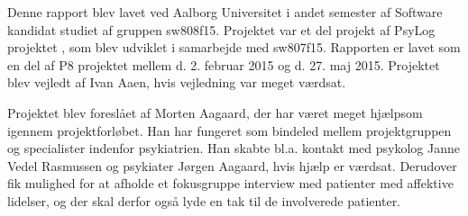 Denne rapport blev lavet ved Aalborg Universitet i andet semester af Software kandidat studiet af gruppen sw808f15.
Projektet var et del projekt af PsyLog projektet \citep{misc:faellesrapp}, som blev udviklet i samarbejde med sw807f15.
Rapporten er lavet som en del af P8 projektet mellem d. 2. februar 2015 og d. 27. maj 2015.
Projektet blev vejledt af Ivan Aaen, hvis vejledning var meget værdsat.

Projektet blev foreslået af Morten Aagaard, der har været meget hjælpsom igennem projektforløbet.
Han har fungeret som bindeled mellem projektgruppen og specialister indenfor psykiatrien. 
Han skabte bl.a. kontakt med psykolog Janne Vedel Rasmussen og psykiater Jørgen Aagaard, hvis hjælp er værdsat.
Derudover fik mulighed for at afholde et fokusgruppe interview med patienter med affektive lidelser, og der skal derfor også lyde en tak til de involverede patienter.